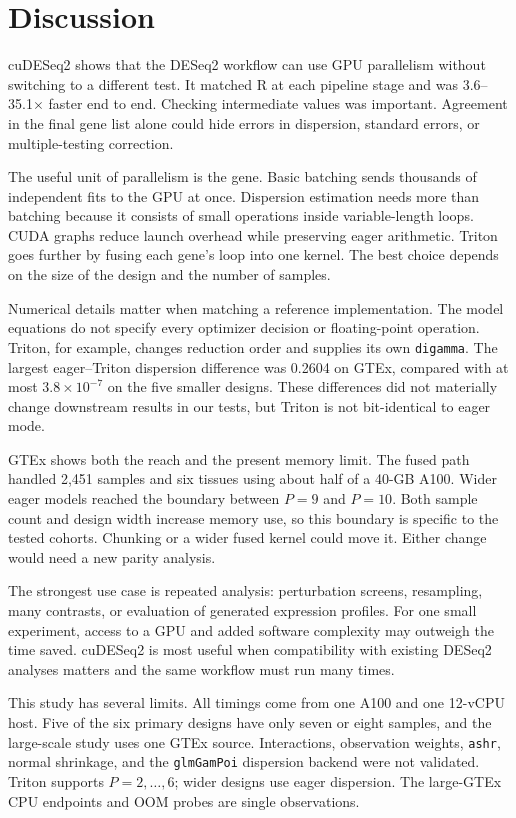 \documentclass[12pt]{article}
\newcommand{\fact}[1]{#1}
\newcommand{\cudeseq}{cuDESeq2}
\begin{document}
\section{Discussion}
\label{sec:discussion}
\cudeseq{} shows that the DESeq2 workflow can use GPU parallelism without
switching to a different test. It matched R at each pipeline stage and was
\fact{3.6--35.1$\times$} faster end to end. Checking intermediate values was
important. Agreement in the final gene list alone could hide errors in
dispersion, standard errors, or multiple-testing correction.

The useful unit of parallelism is the gene. Basic batching sends thousands of
independent fits to the GPU at once. Dispersion estimation needs more than
batching because it consists of small operations inside variable-length loops.
CUDA graphs reduce launch overhead while preserving eager arithmetic. Triton
goes further by fusing each gene's loop into one kernel. The best choice depends
on the size of the design and the number of samples.

Numerical details matter when matching a reference implementation. The model
equations do not specify every optimizer decision or floating-point operation.
Triton, for example, changes reduction order and supplies its own
\texttt{digamma}. The largest eager--Triton dispersion difference was
\fact{0.2604} on GTEx, compared with at most
\fact{$3.8 \times 10^{-7}$} on the five smaller designs. These differences did
not materially change downstream results in our tests, but Triton is not
bit-identical to eager mode.

GTEx shows both the reach and the present memory limit. The fused path handled
2{,}451 samples and six tissues using about half of a 40-GB A100. Wider eager
models reached the boundary between $P=9$ and $P=10$. Both sample count and
design width increase memory use, so this boundary is specific to the tested
cohorts. Chunking or a wider fused kernel could move it. Either change would
need a new parity analysis.

The strongest use case is repeated analysis: perturbation screens, resampling,
many contrasts, or evaluation of generated expression profiles. For one small
experiment, access to a GPU and added software complexity may outweigh the
time saved. \cudeseq{} is most useful when compatibility with existing DESeq2
analyses matters and the same workflow must run many times.

This study has several limits. All timings come from one A100 and one 12-vCPU
host. Five of the six primary designs have only seven or eight samples, and the
large-scale study uses one GTEx source. Interactions, observation weights,
\texttt{ashr}, normal shrinkage, and the \texttt{glmGamPoi} dispersion backend
were not validated. Triton supports $P=2,\dots,6$; wider designs use eager
dispersion. The large-GTEx CPU endpoints and OOM probes are single observations.
\end{document}
